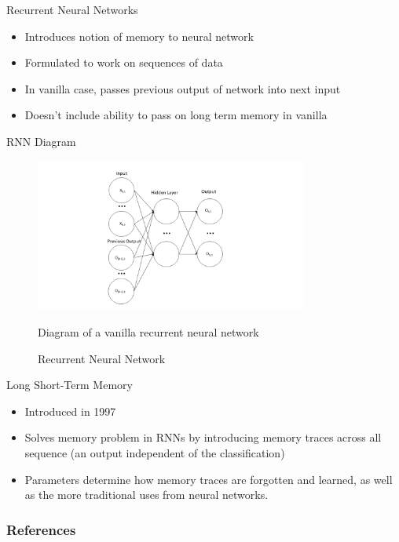 \documentclass{beamer}
\begin{document}
\begin{frame}{Recurrent Neural Networks}
\begin{itemize}
    \item Introduces notion of memory to neural network
    \item Formulated to work on sequences of data
    \item In vanilla case, passes previous output of network into next input
    \item Doesn't include ability to pass on long term memory in vanilla 
\end{itemize}
    
\end{frame}
\begin{frame}{RNN Diagram}
    \begin{figure}
    \centering
    \includegraphics[width=0.8\textwidth]{figures/RNN.png}
    \caption{Recurrent Neural Network}
    \label{fig:rnn}
    Diagram of a vanilla recurrent neural network
\end{figure}
\end{frame}

\begin{frame}{Long Short-Term Memory}
\begin{itemize}
    \item Introduced in 1997\cite{LSTM}
    \item Solves memory problem in RNNs by introducing memory traces across all sequence (an output independent of the classification)
    \item Parameters determine how memory traces are forgotten and learned, as well as the more traditional uses from neural networks.
\end{itemize}
    
\end{frame}


\begin{frame}
\frametitle{References}


\end{frame}
\end{document}
